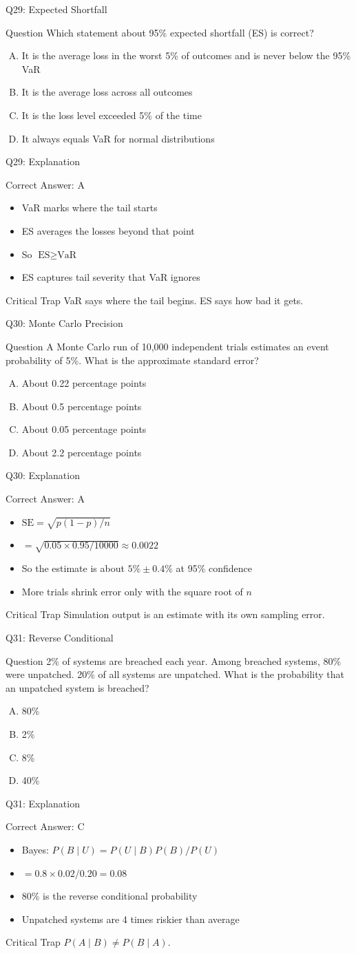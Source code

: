 \documentclass[aspectratio=169]{beamer}
\newcommand{\hq}[7]{%
  \begin{frame}{Q#1: #2}
    \begin{block}{Question}
      #3
    \end{block}
    \begin{enumerate}[(A)]
      #4
    \end{enumerate}
  \end{frame}
  \begin{frame}{Q#1: Explanation}
    \begin{block}{Correct Answer: #5}
      \begin{itemize}
        #6
      \end{itemize}
    \end{block}
    \begin{alertblock}{Critical Trap}
      #7
    \end{alertblock}
  \end{frame}
}
\begin{document}
\hq{29}{Expected Shortfall}
{Which statement about 95\% expected shortfall (ES) is correct?}
{\item It is the average loss in the worst 5\% of outcomes and is never below the 95\% VaR
 \item It is the average loss across all outcomes
 \item It is the loss level exceeded 5\% of the time
 \item It always equals VaR for normal distributions}
{A}
{\item VaR marks where the tail starts
 \item ES averages the losses beyond that point
 \item So $\text{ES} \geq \text{VaR}$
 \item ES captures tail severity that VaR ignores}
{VaR says where the tail begins. ES says how bad it gets.}

\hq{30}{Monte Carlo Precision}
{A Monte Carlo run of 10,000 independent trials estimates an event probability of 5\%. What is the approximate standard error?}
{\item About 0.22 percentage points
 \item About 0.5 percentage points
 \item About 0.05 percentage points
 \item About 2.2 percentage points}
{A}
{\item $\text{SE} = \sqrt{p(1-p)/n}$
 \item $= \sqrt{0.05 \times 0.95 / 10000} \approx 0.0022$
 \item So the estimate is about $5\% \pm 0.4\%$ at 95\% confidence
 \item More trials shrink error only with the square root of $n$}
{Simulation output is an estimate with its own sampling error.}

\hq{31}{Reverse Conditional}
{2\% of systems are breached each year. Among breached systems, 80\% were unpatched. 20\% of all systems are unpatched. What is the probability that an unpatched system is breached?}
{\item 80\%
 \item 2\%
 \item 8\%
 \item 40\%}
{C}
{\item Bayes: $P(B \mid U) = P(U \mid B)P(B)/P(U)$
 \item $= 0.8 \times 0.02 / 0.20 = 0.08$
 \item 80\% is the reverse conditional probability
 \item Unpatched systems are 4 times riskier than average}
{$P(A \mid B) \neq P(B \mid A)$.}
\end{document}
